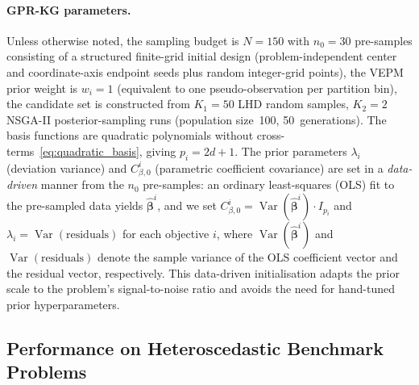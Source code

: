 \documentclass[12pt]{article}
\theoremstyle{plain}
\theoremstyle{definition}
\theoremstyle{remark}
\DeclareMathOperator{\Var}{Var}
\begin{document}
\paragraph{GPR-KG parameters.}
Unless otherwise noted, the sampling budget is $N=150$ with $n_{0}=30$
pre-samples consisting of a structured finite-grid initial design
(problem-independent center and coordinate-axis endpoint seeds plus
random integer-grid points), the VEPM prior weight is $w_{i}=1$
(equivalent to one pseudo-observation per partition bin), the
candidate set is constructed from $K_1=50$ LHD random samples,
$K_2=2$ NSGA-II posterior-sampling runs (population size~100,
50~generations).  The basis functions are
quadratic polynomials without cross-terms~\eqref{eq:quadratic_basis},
giving $p_{i}=2d+1$.  The prior parameters $\lambda_i$
(deviation variance) and $C^i_{\beta,0}$ (parametric coefficient
covariance) are set in a \emph{data-driven} manner from the $n_0$
pre-samples: an ordinary least-squares (OLS) fit to the pre-sampled
data yields $\hat{\boldsymbol{\beta}}^i$, and we set
$C^i_{\beta,0} = \Var(\hat{\boldsymbol{\beta}}^i)\cdot I_{p_i}$ and
$\lambda_i = \Var(\text{residuals})$ for each objective $i$, where
$\Var(\hat{\boldsymbol{\beta}}^i)$ and $\Var(\text{residuals})$ denote
the sample variance of the OLS coefficient vector and the residual
vector, respectively.  This data-driven initialisation adapts the prior
scale to the problem's signal-to-noise ratio and avoids the need for
hand-tuned prior hyperparameters.


\subsection{Performance on Heteroscedastic Benchmark Problems}\label{subsec:exp_standard}
\end{document}
